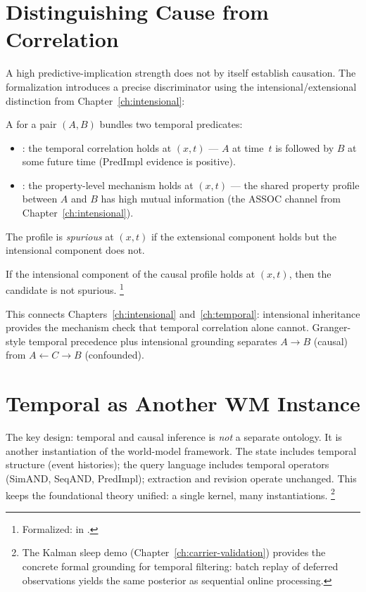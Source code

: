 \documentclass[11pt,openany]{report}
\begin{document}
\section{Distinguishing Cause from Correlation}

A high predictive-implication strength does not by itself establish
causation.  The formalization introduces a precise discriminator
using the intensional/extensional distinction from
Chapter~\ref{ch:intensional}:

\begin{definition}
A  for a pair $(A, B)$ bundles two
temporal predicates:
\begin{itemize}
\item {}: the temporal correlation holds at $(x, t)$
  --- $A$ at time~$t$ is followed by $B$ at some future time
  (PredImpl evidence is positive).
\item {}: the property-level mechanism holds at
  $(x, t)$ --- the shared property profile between $A$ and $B$
  has high mutual information (the ASSOC channel from
  Chapter~\ref{ch:intensional}).
\end{itemize}
The profile is \emph{spurious} at $(x, t)$ if the extensional
component holds but the intensional component does not.
\end{definition}

\begin{theorem}
\label{thm:not-spurious}
If the intensional component of the causal profile holds at $(x, t)$,
then the candidate is not spurious.%
\footnote{Formalized:
 in
.}
\end{theorem}

\noindent
This connects Chapters~\ref{ch:intensional} and~\ref{ch:temporal}:
intensional inheritance provides the mechanism check that temporal
correlation alone cannot.  Granger-style temporal precedence plus
intensional grounding separates $A \to B$ (causal) from
$A \leftarrow C \to B$ (confounded).


\section{Temporal as Another WM Instance}

The key design: temporal and causal inference is \emph{not} a
separate ontology.  It is another instantiation of the world-model
framework.  The state includes temporal structure (event histories);
the query language includes temporal operators (SimAND, SeqAND,
PredImpl); extraction and revision operate unchanged.  This keeps
the foundational theory unified: a single kernel, many
instantiations.%
\footnote{The Kalman sleep demo
(Chapter~\ref{ch:carrier-validation}) provides the concrete
formal grounding for temporal filtering: batch replay of deferred
observations yields the same posterior as sequential online
processing.}
\end{document}
